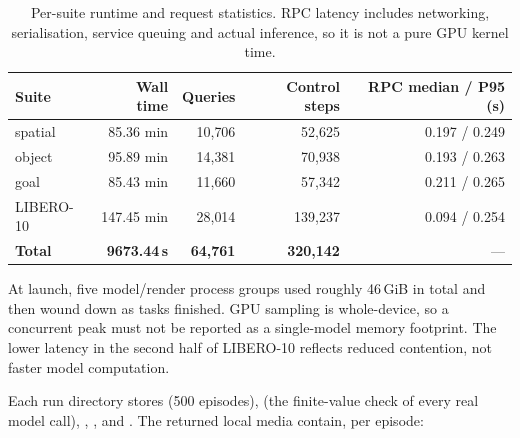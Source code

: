 \begin{table}[H]
  \centering
  \small
  \caption{Per-suite runtime and request statistics. RPC latency includes
  networking, serialisation, service queuing and actual inference, so it is not
  a pure GPU kernel time.}
  \label{tab:pi05-timing}
  \begin{tabular}{@{}lrrrr@{}}
    \toprule
    Suite & Wall time & Queries & Control steps & RPC median / P95 (s) \\
    \midrule
    spatial   & 85.36 min  & 10{,}706 & 52{,}625  & 0.197 / 0.249 \\
    object    & 95.89 min  & 14{,}381 & 70{,}938  & 0.193 / 0.263 \\
    goal      & 85.43 min  & 11{,}660 & 57{,}342  & 0.211 / 0.265 \\
    LIBERO-10 & 147.45 min & 28{,}014 & 139{,}237 & 0.094 / 0.254 \\
    \midrule
    \textbf{Total} & \textbf{9673.44\,s} & \textbf{64{,}761} &
    \textbf{320{,}142} & --- \\
    \bottomrule
  \end{tabular}
\end{table}

At launch, five model/render process groups used roughly 46\,GiB in total and
then wound down as tasks finished. GPU sampling is whole-device, so a concurrent
peak must not be reported as a single-model memory footprint. The lower latency
in the second half of LIBERO-10 reflects reduced contention, not faster model
computation.

Each run directory stores  (500 episodes),
 (the finite-value check of every real model
call), , ,  and
. The returned local media contain, per episode:

